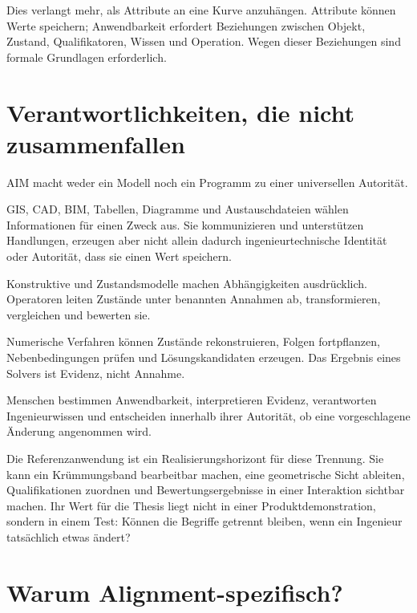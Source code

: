 Dies verlangt mehr, als Attribute an eine Kurve anzuhängen. Attribute können
Werte speichern; Anwendbarkeit erfordert Beziehungen zwischen Objekt, Zustand,
Qualifikatoren, Wissen und Operation. Wegen dieser Beziehungen sind formale
Grundlagen erforderlich.

\section{Verantwortlichkeiten, die nicht zusammenfallen}

AIM macht weder ein Modell noch ein Programm zu einer universellen Autorität.

\begin{description}[style=nextline]
\item[Repräsentationen]
GIS, CAD, BIM, Tabellen, Diagramme und Austauschdateien wählen Informationen
für einen Zweck aus. Sie kommunizieren und unterstützen Handlungen, erzeugen
aber nicht allein dadurch ingenieurtechnische Identität oder Autorität, dass
sie einen Wert speichern.

\item[Modelle und Operatoren]
Konstruktive und Zustandsmodelle machen Abhängigkeiten ausdrücklich.
Operatoren leiten Zustände unter benannten Annahmen ab, transformieren,
vergleichen und bewerten sie.

\item[Berechnung]
Numerische Verfahren können Zustände rekonstruieren, Folgen fortpflanzen,
Nebenbedingungen prüfen und Lösungskandidaten erzeugen. Das Ergebnis eines
Solvers ist Evidenz, nicht Annahme.

\item[Ingenieure und verantwortliche Autoritäten]
Menschen bestimmen Anwendbarkeit, interpretieren Evidenz, verantworten
Ingenieurwissen und entscheiden innerhalb ihrer Autorität, ob eine
vorgeschlagene Änderung angenommen wird.
\end{description}

Die Referenzanwendung ist ein Realisierungshorizont für diese Trennung. Sie
kann ein Krümmungsband bearbeitbar machen, eine geometrische Sicht ableiten,
Qualifikationen zuordnen und Bewertungsergebnisse in einer Interaktion
sichtbar machen. Ihr Wert für die Thesis liegt nicht in einer
Produktdemonstration, sondern in einem Test: Können die Begriffe getrennt
bleiben, wenn ein Ingenieur tatsächlich etwas ändert?

\section{Warum Alignment-spezifisch?}

